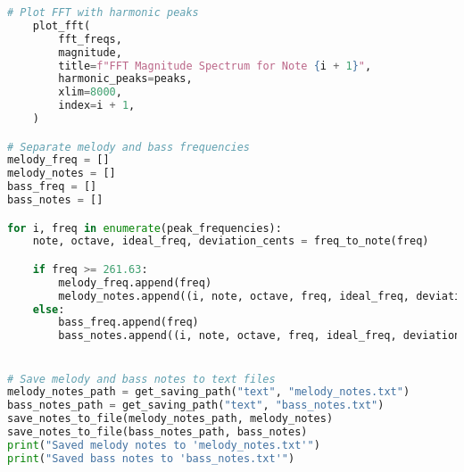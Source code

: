\begin{lstlisting}[language=Python, caption={main.py}, label={lst:main}]
    # Plot FFT with harmonic peaks
    plot_fft(
        fft_freqs,
        magnitude,
        title=f"FFT Magnitude Spectrum for Note {i + 1}",
        harmonic_peaks=peaks,
        xlim=8000,
        index=i + 1,
    )

# Separate melody and bass frequencies
melody_freq = []
melody_notes = []
bass_freq = []
bass_notes = []

for i, freq in enumerate(peak_frequencies):
    note, octave, ideal_freq, deviation_cents = freq_to_note(freq)

    if freq >= 261.63:
        melody_freq.append(freq)
        melody_notes.append((i, note, octave, freq, ideal_freq, deviation_cents))
    else:
        bass_freq.append(freq)
        bass_notes.append((i, note, octave, freq, ideal_freq, deviation_cents))


# Save melody and bass notes to text files
melody_notes_path = get_saving_path("text", "melody_notes.txt")
bass_notes_path = get_saving_path("text", "bass_notes.txt")
save_notes_to_file(melody_notes_path, melody_notes)
save_notes_to_file(bass_notes_path, bass_notes)
print("Saved melody notes to 'melody_notes.txt'")
print("Saved bass notes to 'bass_notes.txt'")

\end{lstlisting}

